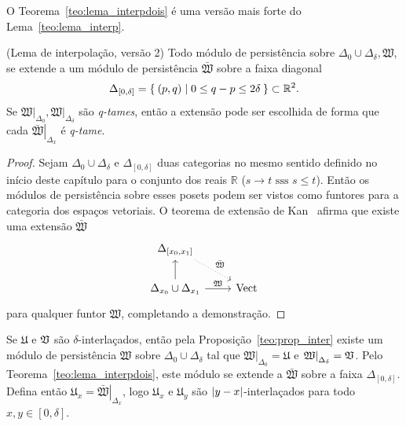O Teorema~\ref{teo:lema_interpdois} é uma versão mais forte do 
Lema~\ref{teo:lema_interp}. 
\begin{teo}{(Lema de interpolação, versão 2)}\label{teo:lema_interpdois}
Todo módulo de persistência sobre $\Delta_0 \cup 
\Delta_\delta, \mathfrak{W}$, se extende a um módulo de persistência 
$\bar{\mathfrak{W}}$ sobre a faixa diagonal
\begin{equation*}
    \Delta_{[0, \delta]} = \Set{(p,q) | 0 \leq q - p \leq 2\delta}
    \subset \mathbb{R}^2.
\end{equation*} 
Se $\left.\mathfrak{W}\right|_{\Delta_0}, \left.\mathfrak{W}
\right|_{\Delta_\delta}$ são \textit{q-tames}, então a extensão
pode ser escolhida de forma que cada $\left.\bar{\mathfrak{W}}
\right|_{\Delta_x}$ é \textit{q-tame}. 
\end{teo}
\begin{proof}
    Sejam $\Delta_0 \cup \Delta_\delta$ e $\Delta_{[0,\delta]}$ duas 
    categorias no mesmo sentido definido no início deste capítulo para
    o conjunto dos reais $\mathbb{R}$ ($s \to t \text{ sss } s \leq t$).
    Então os módulos de persistência sobre esses posets podem ser vistos
    como funtores para a categoria dos espaços vetoriais. O teorema
    de extensão de Kan~\cite{MacLane1978} afirma que existe uma extensão
    $\bar{\mathfrak{W}}$ 
    \begin{equation*}
        \begin{tikzcd}
            {\Delta_{[x_0,x_1]}} \arrow[dotted]{rd}{\bar{\mathfrak{W}}}     &             \\
            \Delta_{x_0} \cup \Delta_{x_1} \arrow{u} \arrow{r}{\mathfrak{W}}  & \text{Vect}
        \end{tikzcd}
    \end{equation*}
    para qualquer funtor $\mathfrak{W}$, completando
    a demonstração. 
\end{proof}

Se $\mathfrak{U}$ e $\mathfrak{V}$ são $\delta$-interlaçados, então 
pela Proposição~\ref{teo:prop_inter} existe um módulo de 
persistência $\mathfrak{W}$ sobre $\Delta_0 \cup \Delta_\delta$ tal
que $\left.\mathfrak{W}\right|_{\Delta_0} = \mathfrak{U}$ e 
$\left.\mathfrak{W}\right|_{\Delta_\delta} = \mathfrak{V}$. Pelo 
Teorema~\ref{teo:lema_interpdois}, este módulo se extende a 
$\bar{\mathfrak{W}}$ sobre a faixa $\Delta_{[0,\delta]}$.
Defina então $\mathfrak{U}_x = \left.\bar{\mathfrak{W}}\right|_{
\Delta_x}$, logo $\mathfrak{U}_x$ e $\mathfrak{U}_y$ são 
$\left\lvert y-x\right\rvert$-interlaçados para todo $x,y\in [0, \delta]$. 

